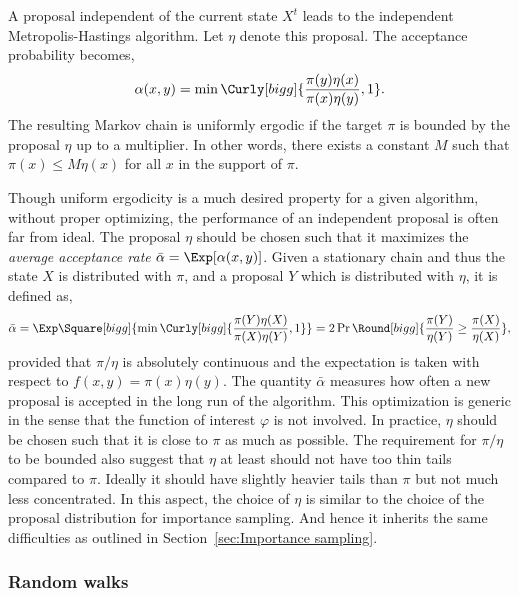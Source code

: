 A proposal independent of the current state $X^t$ leads to the independent
Metropolis-Hastings algorithm. Let $\eta$ denote this proposal. The acceptance
probability becomes,
\begin{equation}
  \alpha(x,y) = \min\Curly[bigg]{\frac{\pi(y)\eta(x)}{\pi(x)\eta(y)},1}.
\end{equation}
The resulting Markov chain is uniformly ergodic if the target $\pi$ is bounded
by the proposal $\eta$ up to a multiplier. In other words, there exists a
constant $M$ such that $\pi(x)\le M\eta(x)$ for all $x$ in the support of
$\pi$.

Though uniform ergodicity is a much desired property for a given algorithm,
without proper optimizing, the performance of an independent proposal is often
far from ideal. The proposal $\eta$ should be chosen such that it maximizes the
\emph{average acceptance rate} $\bar\alpha = \Exp[\alpha(x,y)]$. Given a
stationary chain and thus the state $X$ is distributed with $\pi$, and a
proposal $Y$ which is distributed with $\eta$, it is defined as,
\begin{equation}
  \bar\alpha
  = \Exp\Square[bigg]{\min\Curly[bigg]{\frac{\pi(Y)\eta(X)}{\pi(X)\eta(Y)},1}}
  = 2\Pr\Round[bigg]{\frac{\pi(Y)}{\eta(Y)}\ge\frac{\pi(X)}{\eta(X)}},
\end{equation}
provided that $\pi/\eta$ is absolutely continuous and the expectation is taken
with respect to $f(x,y) = \pi(x)\eta(y)$. The quantity $\bar\alpha$ measures
how often a new proposal is accepted in the long run of the algorithm. This
optimization is generic in the sense that the function of interest $\varphi$
is not involved. In practice, $\eta$ should be chosen such that it is close to
$\pi$ as much as possible. The requirement for $\pi/\eta$ to be bounded also
suggest that $\eta$ at least should not have too thin tails compared to $\pi$.
Ideally it should have slightly heavier tails than $\pi$ but not much less
concentrated. In this aspect, the choice of $\eta$ is similar to the choice of
the proposal distribution for importance sampling. And hence it inherits the
same difficulties as outlined in Section~\ref{sec:Importance sampling}.

\subsubsection{Random walks}
\label{ssub:Random walks}

